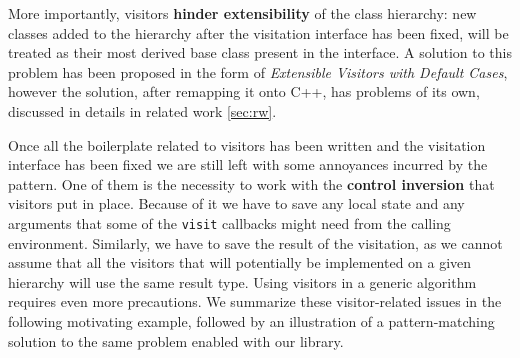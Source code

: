 \documentclass[preprint]{sigplanconf}
\makeatletter
\DeclareRobustCommand{\code}[1]{{\lstinline[breaklines=false,escapechar=@]{#1}}}
\makeatother
\begin{document}
More importantly, visitors {\bf hinder extensibility} of the class hierarchy: 
new classes added to the hierarchy after the visitation interface has been 
fixed, will be treated as their most derived base class present in the interface.
A solution to this problem has been proposed in the form of \emph{Extensible 
Visitors with Default Cases}\cite[]{Zenger:2001}, however the 
solution, after remapping it onto C++, has problems of its own, discussed in 
details in related work \textsection\ref{sec:rw}.


Once all the boilerplate related to visitors has been written and the visitation 
interface has been fixed we are still left with some annoyances incurred by the 
pattern. One of them is the necessity to work with the {\bf control inversion} 
that visitors put in place. Because of it we have to save any local state and 
any arguments that some of the \code{visit} callbacks might need from the 
calling environment. Similarly, we have to save the result of the visitation, 
as we cannot assume that all the visitors that will potentially be implemented 
on a given hierarchy will use the same result type. Using visitors in a generic 
algorithm requires even more precautions. We summarize these visitor-related 
issues in the following motivating example, followed by an illustration of a 
pattern-matching solution to the same problem enabled with our library.
\end{document}
